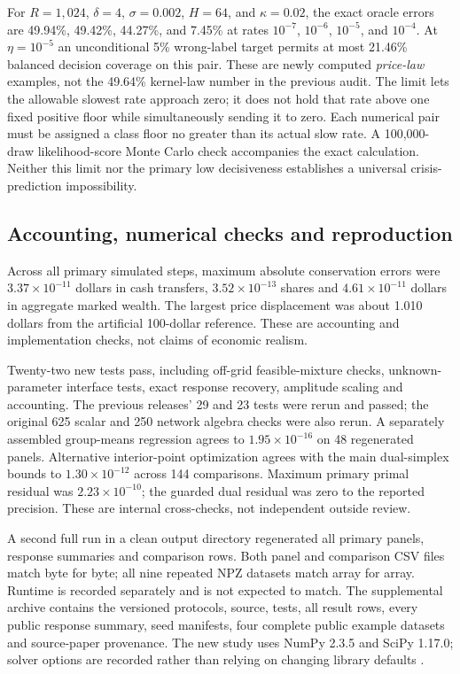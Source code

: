 \documentclass[11pt,a4paper]{article}
\theoremstyle{definition}
\theoremstyle{remark}
\begin{document}
For $R=1,024$, $\delta=4$, $\sigma=0.002$, $H=64$, and $\kappa=0.02$, the exact oracle errors are 49.94\%, 49.42\%, 44.27\%, and 7.45\% at rates $10^{-7}$, $10^{-6}$, $10^{-5}$, and $10^{-4}$. At $\eta=10^{-5}$ an unconditional 5\% wrong-label target permits at most 21.46\% balanced decision coverage on this pair. These are newly computed \emph{price-law} examples, not the 49.64\% kernel-law number in the previous audit. The limit lets the allowable slowest rate approach zero; it does not hold that rate above one fixed positive floor while simultaneously sending it to zero. Each numerical pair must be assigned a class floor no greater than its actual slow rate. A 100,000-draw likelihood-score Monte Carlo check accompanies the exact calculation. Neither this limit nor the primary low decisiveness establishes a universal crisis-prediction impossibility.

\subsection{Accounting, numerical checks and reproduction}
Across all primary simulated steps, maximum absolute conservation errors were $3.37\times10^{-11}$ dollars in cash transfers, $3.52\times10^{-13}$ shares and $4.61\times10^{-11}$ dollars in aggregate marked wealth. The largest price displacement was about 1.010 dollars from the artificial 100-dollar reference. These are accounting and implementation checks, not claims of economic realism.

Twenty-two new tests pass, including off-grid feasible-mixture checks, unknown-parameter interface tests, exact response recovery, amplitude scaling and accounting. The previous releases' 29 and 23 tests were rerun and passed; the original 625 scalar and 250 network algebra checks were also rerun. A separately assembled group-means regression agrees to $1.95\times10^{-16}$ on 48 regenerated panels. Alternative interior-point optimization agrees with the main dual-simplex bounds to $1.30\times10^{-12}$ across 144 comparisons. Maximum primary primal residual was $2.23\times10^{-10}$; the guarded dual residual was zero to the reported precision. These are internal cross-checks, not independent outside review.

A second full run in a clean output directory regenerated all primary panels, response summaries and comparison rows. Both panel and comparison CSV files match byte for byte; all nine repeated NPZ datasets match array for array. Runtime is recorded separately and is not expected to match. The supplemental archive contains the versioned protocols, source, tests, all result rows, every public response summary, seed manifests, four complete public example datasets and source-paper provenance. The new study uses NumPy 2.3.5 and SciPy 1.17.0; solver options are recorded rather than relying on changing library defaults \citep{scipy_highs}.
\end{document}
